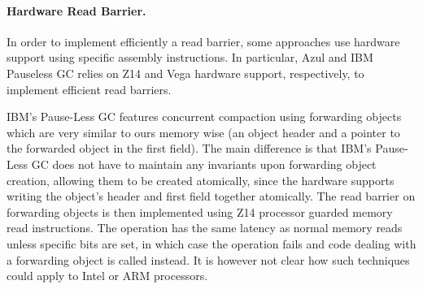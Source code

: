 \documentclass[sigplan,10pt,screen]{acmart}\settopmatter{printfolios=true,printccs=true,printacmref=true}
\begin{document}
\paragraph{Hardware Read Barrier.} 
In order to implement efficiently a read barrier, some approaches use hardware support using specific assembly instructions. In particular, Azul and IBM Pauseless GC \cite{AzulHardwareReadBarrierConcCompact,IBMConcCompact} relies on Z14 and Vega hardware support, respectively, to implement efficient read barriers.


IBM's Pause-Less GC \cite{IBMConcCompact} features concurrent compaction using forwarding objects which are very similar to ours memory wise (an object header and a pointer to the forwarded object in the first field). The main difference is that IBM's Pause-Less GC does not have to maintain any invariants upon forwarding object creation, allowing them to be created atomically, since the hardware supports writing the object's header and first field together atomically. The read barrier on forwarding objects is then implemented using Z14 processor guarded memory read instructions. The operation has the same latency as normal memory reads unless specific bits are set, in which case the operation fails and code dealing with a forwarding object is called instead. It is however not clear how such techniques could apply to Intel or ARM processors.
\end{document}
